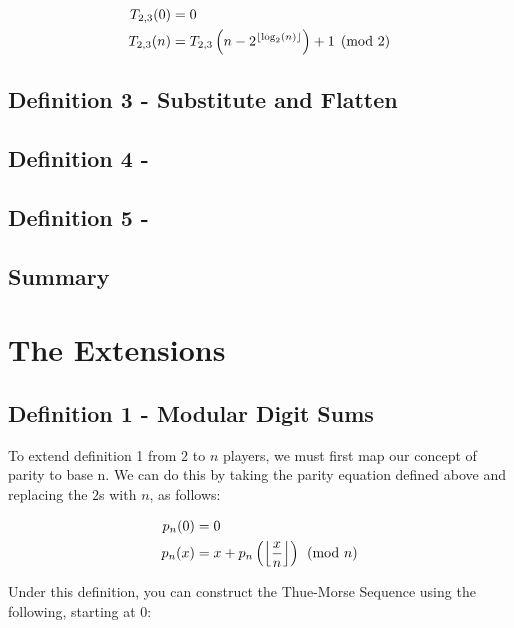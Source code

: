 \documentclass[conference]{IEEEtran}
\begin{document}
\begin{equation}
    \begin{aligned}
        T_{2,3}(0) &= 0 \\
        T_{2,3}(n) &= T_{2,3}\left(n - 2^{\left\lfloor \log_2(n) \right\rfloor}\right) + 1 \pmod{2}
    \end{aligned}
\end{equation}

\subsection{Definition 3 - Substitute and Flatten}

\subsection{Definition 4 - }

\subsection{Definition 5 - }

\subsection{Summary}

\section{The Extensions}

\subsection{Definition 1 - Modular Digit Sums}

To extend definition 1 from $2$ to $n$ players, we must first map our concept of parity to base n. We can do this by taking the parity equation defined above and replacing the $2$s with $n$, as follows:

\begin{equation}
    \begin{aligned}
        p_n(0) &= 0 \\
        p_n(x) &= x + p_n\left(\left\lfloor \dfrac{x}{n} \right\rfloor\right) \pmod{n}
    \end{aligned}
\end{equation}

Under this definition, you can construct the Thue-Morse Sequence using the following, starting at 0:
\end{document}

